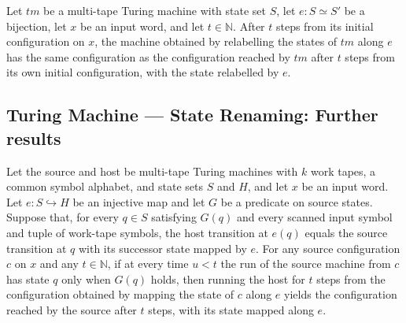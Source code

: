 \begin{lemma}
\label{Turing.MultiTapeTM.relabelState_runFrom_init}
\leanok
{}
Let $tm$ be a multi-tape Turing machine with state set $S$, let $e:S\simeq S'$ be a
bijection, let $x$ be an input word, and let $t\in\mathbb{N}$. After $t$ steps from
its initial configuration on $x$, the machine obtained by relabelling the states of $tm$
along $e$ has the same configuration as the configuration reached by $tm$ after $t$
steps from its own initial configuration, with the state relabelled by $e$.
\end{lemma}

\subsection*{Turing Machine --- State Renaming: Further results}

\begin{theorem}
\label{Turing.MultiTapeTM.runFrom_mapState_of_agreeOn}
\leanok
{}
Let the source and host be multi-tape Turing machines with $k$ work tapes, a common
symbol alphabet, and state sets $S$ and $H$, and let $x$ be an input word. Let
$e:S\hookrightarrow H$ be an injective map and let $G$ be a predicate on source states.
Suppose that, for every $q\in S$ satisfying $G(q)$ and every scanned input symbol and
tuple of work-tape symbols, the host transition at $e(q)$ equals the source transition
at $q$ with its successor state mapped by $e$. For any source configuration $c$ on $x$
and any $t\in\mathbb{N}$, if at every time $u<t$ the run of the source machine from $c$
has state $q$ only when $G(q)$ holds, then running the host for $t$ steps from the
configuration obtained by mapping the state of $c$ along $e$ yields the configuration
reached by the source after $t$ steps, with its state mapped along $e$.
\end{theorem}

